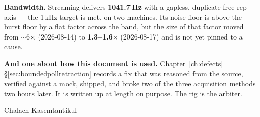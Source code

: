 \begin{titlepage}
\begin{minipage}{0.82\textwidth}
\begin{keybox}
\textbf{Bandwidth.} Streaming delivers \textbf{1041.7\,Hz} with a gapless,
duplicate-free rep axis --- the 1\,kHz target is met, on two machines. Its noise
floor is above the burst floor by a flat factor across the band, but the size of
that factor moved from $\sim$6$\times$ (2026-08-14) to \textbf{1.3--1.6$\times$}
(2026-08-17) and is not yet pinned to a cause.

\textbf{And one about how this document is used.} Chapter~\ref{ch:defects}
\S\ref{sec:boundedpollretraction} records a fix that was reasoned from the source,
verified against a mock, shipped, and broke two of the three acquisition methods
two hours later. It is written up at length on purpose. The rig is the arbiter.
\end{keybox}
\end{minipage}

\vspace{1.2cm}
{\small\color{rulegrey} Chalach Kasemtantikul\par}
\end{titlepage}

\tableofcontents
\clearpage














